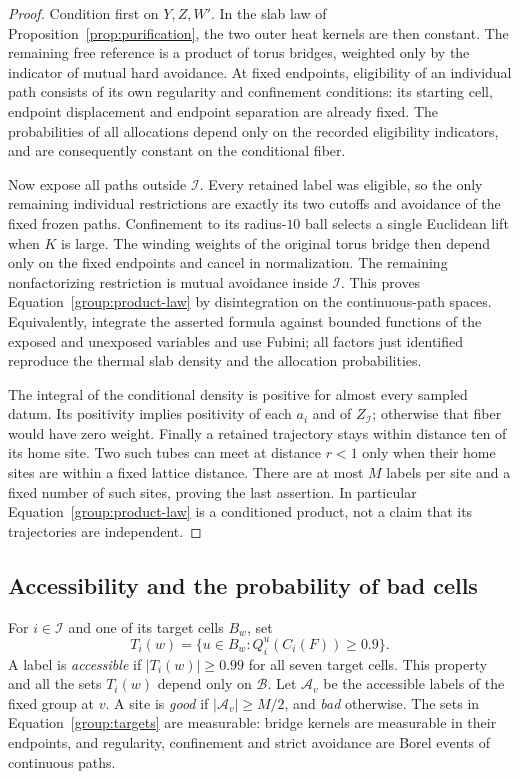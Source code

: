 \begin{proof}
Condition first on $Y,Z,W'$.  In the slab law of
Proposition~\ref{prop:purification}, the two outer heat kernels are then
constant.  The remaining free reference is a product of torus bridges,
weighted only by the indicator of mutual hard avoidance.  At fixed endpoints,
eligibility of an individual path consists of its own regularity and
confinement conditions: its starting cell, endpoint displacement and
endpoint separation are already fixed.  The probabilities of all
allocations depend only on the recorded eligibility indicators, and
are consequently constant on the conditional fiber.

Now expose all paths outside $\mathcal I$.  Every retained label was
eligible, so the only remaining individual restrictions are exactly
its two cutoffs and avoidance of the fixed frozen paths.  Confinement
to its radius-$10$ ball selects a single Euclidean lift when $K$ is
large.  The winding weights of the original torus bridge then depend
only on the fixed endpoints and cancel in normalization.  The remaining
nonfactorizing restriction is mutual avoidance inside $\mathcal I$.
This proves Equation~\eqref{group:product-law} by disintegration on
the continuous-path spaces.  Equivalently, integrate the asserted
formula against bounded functions of the exposed and unexposed
variables and use Fubini; all factors just identified reproduce
the thermal slab density and the allocation probabilities.

The integral of the conditional density is positive for almost every
sampled datum.  Its positivity implies positivity of each $a_i$ and
of $Z_{\mathcal I}$; otherwise that fiber would have zero weight.
Finally a retained trajectory stays within distance ten of its home
site.  Two such tubes can meet at distance $r<1$ only when their home
sites are within a fixed lattice distance.  There are at most $M$
labels per site and a fixed number of such sites, proving the last
assertion.  In particular Equation~\eqref{group:product-law} is a
conditioned product, not a claim that its trajectories are independent.
\end{proof}

\subsection{Accessibility and the probability of bad cells}

For $i\in\mathcal I$ and one of its target cells $B_w$, set
\begin{equation}\label{group:targets}
 T_i(w)=\{u\in B_w:Q_i^u(C_i(F))\ge0.9\}.
\end{equation}
A label is \emph{accessible} if $|T_i(w)|\ge0.99$ for all seven
target cells.  This property and all the sets $T_i(w)$ depend only
on $\mathcal B$.  Let $\mathcal A_v$ be the accessible labels of the
fixed group at $v$.  A site is \emph{good} if
$|\mathcal A_v|\ge M/2$, and \emph{bad} otherwise.  The sets in
Equation~\eqref{group:targets} are measurable: bridge kernels are
measurable in their endpoints, and regularity, confinement and strict
avoidance are Borel events of continuous paths.

